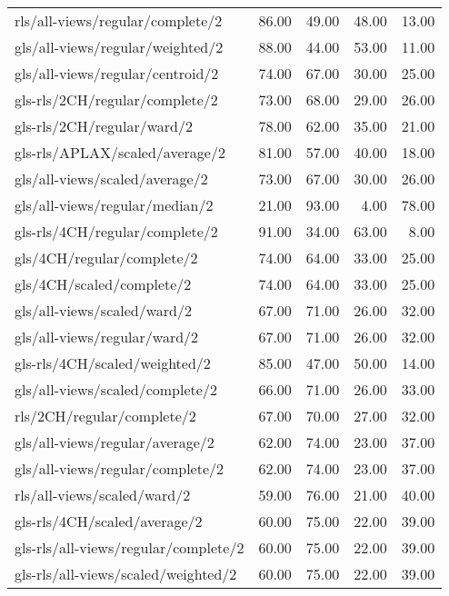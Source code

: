 \begin{longtable}{lrrrr}
    rls/all-views/regular/complete/2          & 86.00 & 49.00 & 48.00 & 13.00 \\
    gls/all-views/regular/weighted/2          & 88.00 & 44.00 & 53.00 & 11.00 \\
    gls/all-views/regular/centroid/2          & 74.00 & 67.00 & 30.00 & 25.00 \\
    gls-rls/2CH/regular/complete/2            & 73.00 & 68.00 & 29.00 & 26.00 \\
    gls-rls/2CH/regular/ward/2                & 78.00 & 62.00 & 35.00 & 21.00 \\
    gls-rls/APLAX/scaled/average/2            & 81.00 & 57.00 & 40.00 & 18.00 \\
    gls/all-views/scaled/average/2            & 73.00 & 67.00 & 30.00 & 26.00 \\
    gls/all-views/regular/median/2            & 21.00 & 93.00 &  4.00 & 78.00 \\
    gls-rls/4CH/regular/complete/2            & 91.00 & 34.00 & 63.00 &  8.00 \\
    gls/4CH/regular/complete/2                & 74.00 & 64.00 & 33.00 & 25.00 \\
    gls/4CH/scaled/complete/2                 & 74.00 & 64.00 & 33.00 & 25.00 \\
    gls/all-views/scaled/ward/2               & 67.00 & 71.00 & 26.00 & 32.00 \\
    gls/all-views/regular/ward/2              & 67.00 & 71.00 & 26.00 & 32.00 \\
    gls-rls/4CH/scaled/weighted/2             & 85.00 & 47.00 & 50.00 & 14.00 \\
    gls/all-views/scaled/complete/2           & 66.00 & 71.00 & 26.00 & 33.00 \\
    rls/2CH/regular/complete/2                & 67.00 & 70.00 & 27.00 & 32.00 \\
    gls/all-views/regular/average/2           & 62.00 & 74.00 & 23.00 & 37.00 \\
    gls/all-views/regular/complete/2          & 62.00 & 74.00 & 23.00 & 37.00 \\
    rls/all-views/scaled/ward/2               & 59.00 & 76.00 & 21.00 & 40.00 \\
    gls-rls/4CH/scaled/average/2              & 60.00 & 75.00 & 22.00 & 39.00 \\
    gls-rls/all-views/regular/complete/2      & 60.00 & 75.00 & 22.00 & 39.00 \\
    gls-rls/all-views/scaled/weighted/2       & 60.00 & 75.00 & 22.00 & 39.00 \\

\end{longtable}
